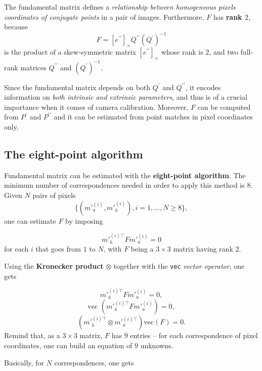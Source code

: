 \documentclass[10pt]{report}
\begin{document}
The fundamental matrix defines a \emph{relationship between homogeneous pixels coordinates of conjugate points} in a pair of images. Furthermore, \(F\) has \textbf{rank \(2\)}, because $$F = [e^{\prime\prime}]_\times Q^{\prime\prime}(Q^{\prime})^{-1}$$ is the product of a skew\--symmetric matrix \([e^{\prime\prime}]_\times\) whose rank is \(2\), and two full\--rank matrices \(Q^{\prime\prime}\) and \((Q^{\prime})^{-1}\).

Since the fundamental matrix depends on both \(Q^{\prime}\) and \(Q^{\prime\prime}\), it encodes information on \emph{both intrinsic and extrinsic parameters}, and thus is of a crucial importance when it comes of camera calibration. Moreover, \(F\) can be computed from \(P^{\prime}\) and \(P^{\prime\prime}\) and it can be estimated from point matches in pixel coordinates only.

\subsection{The eight\--point algorithm}
\label{sec:orgae10532}
Fundamental matrix can be estimated with the \textbf{eight-point algorithm}.
The minimum number of correspondences needed in order to apply this
method is \(8\). Given \(N\) pairs of pixels
\[\{(m'^{(i)}_ a, m'^{(i)}_ b), i = 1, \dots, N \geq 8\},\] one can
estimate \(F\) by imposing

\[m'^{(i)\top}_ b F m'^{(i)}_ a = 0\] for each \(i\) that goes from
\(1\) to \(N\), with \(F\) being a \(3 \times 3\) matrix having rank
\(2\).

Using the \textbf{Kronecker product} \(\otimes\) together with the \texttt{vec}
\emph{vector operator}, one gets

\[m'^{(i)\top}_ b F m'^{(i)}_ a = 0,\]
\[\mbox{vec }(m'^{(i)\top}_ b F m'^{(i)}_ a) = 0,\]
\[(m'^{(i)\top}_ b \otimes m'^{(i)\top}_ a)\mbox{vec}(F) = 0.\] Remind that, as a \(3\times 3\) matrix, \(F\) has \(9\) entries -- for each correspondence of pixel coordinates, one can build an equation of \(9\) unknowns.

Basically, for \(N\) correspondences, one gets
\end{document}
